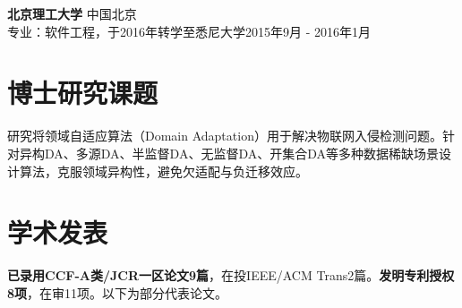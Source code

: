 \documentclass[UTF8,letterpaper,11pt]{article}
\begin{document}
\vspace{9pt}

\textbf{北京理工大学} \hfill 中国北京\\
专业：软件工程，于2016年转学至悉尼大学\hfill 2015年9月 - 2016年1月\\

\vspace{1pt}




\section{\textbf{博士研究课题}}

研究将领域自适应算法（Domain Adaptation）用于解决物联网入侵检测问题。针对异构DA、多源DA、半监督DA、无监督DA、开集合DA等多种数据稀缺场景设计算法，克服领域异构性，避免欠适配与负迁移效应。

\vspace{1pt}




\section{\textbf{学术发表}}

\textbf{已录用CCF-A类/JCR一区论文9篇}，在投IEEE/ACM Trans2篇。\textbf{发明专利授权8项}，在审11项。以下为部分代表论文。
\end{document}
